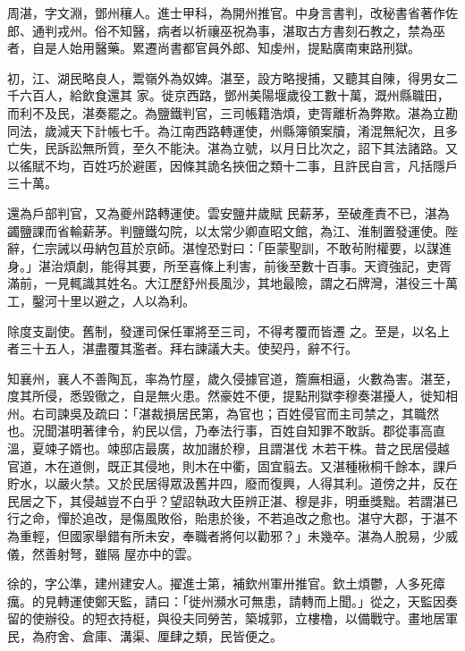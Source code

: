 \begin{pinyinscope}
 周湛，字文淵，鄧州穰人。進士甲科，為開州推官。中身言書判，改秘書省著作佐郎、通判戎州。俗不知醫，病者以祈禳巫祝為事，湛取古方書刻石教之，禁為巫者，自是人始用醫藥。累遷尚書都官員外郎、知虔州，提點廣南東路刑獄。



 初，江、湖民略良人，鬻嶺外為奴婢。湛至，設方略搜捕，又聽其自陳，得男女二千六百人，給飲食還其
 家。徙京西路，鄧州美陽堰歲役工數十萬，溉州縣職田，而利不及民，湛奏罷之。為鹽鐵判官，三司帳籍浩煩，吏胥離析為弊欺。湛為立勘同法，歲減天下計帳七千。為江南西路轉運使，州縣簿領案牘，淆混無紀次，且多亡失，民訴訟無所質，至久不能決。湛為立號，以月日比次之，詔下其法諸路。又以徭賦不均，百姓巧於避匿，因條其詭名挾佃之類十二事，且許民自言，凡括隱戶三十萬。



 還為戶部判官，又為夔州路轉運使。雲安鹽井歲賦
 民薪茅，至破產責不已，湛為蠲鹽課而省輸薪茅。判鹽鐵勾院，以太常少卿直昭文館，為江、淮制置發運使。陛辭，仁宗誡以毋納包苴於京師。湛惶恐對曰：「臣蒙聖訓，不敢茍附權要，以謀進身。」湛治煩劇，能得其要，所至喜條上利害，前後至數十百事。天資強記，吏胥滿前，一見輒識其姓名。大江歷舒州長風沙，其地最險，謂之石牌灣，湛役三十萬工，鑿河十里以避之，人以為利。



 除度支副使。舊制，發運司保任軍將至三司，不得考覆而皆遷
 之。至是，以名上者三十五人，湛盡覆其濫者。拜右諫議大夫。使契丹，辭不行。



 知襄州，襄人不善陶瓦，率為竹屋，歲久侵據官道，簷廡相逼，火數為害。湛至，度其所侵，悉毀徹之，自是無火患。然豪姓不便，提點刑獄李穆奏湛擾人，徙知相州。右司諫吳及疏曰：「湛裁損居民第，為官也；百姓侵官而主司禁之，其職然也。況聞湛明著律令，約民以信，乃奉法行事，百姓自知罪不敢訴。郡從事高直溫，夏竦子婿也。竦邸店最廣，故加譖於穆，且謂湛伐
 木若干株。昔之民居侵越官道，木在道側，既正其侵地，則木在中衢，固宜翦去。又湛種楸桐千餘本，課戶貯水，以嚴火禁。又於民居得眾汲舊井四，廢而復興，人得其利。道傍之井，反在民居之下，其侵越豈不白乎？望詔執政大臣辨正湛、穆是非，明垂獎黜。若謂湛已行之命，憚於追改，是傷風敗俗，貽患於後，不若追改之愈也。湛守大郡，于湛不為重輕，但國家舉錯有所未安，奉職者將何以勸邪？」未幾卒。湛為人脫易，少威儀，然善射弩，雖隔
 屋亦中的雲。



 徐的，字公準，建州建安人。擢進士第，補欽州軍卅推官。欽土煩鬱，人多死瘴癘。的見轉運使鄭天監，請曰：「徙州瀕水可無患，請轉而上聞。」從之，天監因奏留的使辦役。的短衣持梃，與役夫同勞苦，築城郭，立樓櫓，以備戰守。畫地居軍民，為府舍、倉庫、溝渠、厘肆之類，民皆便之。




\end{pinyinscope}
